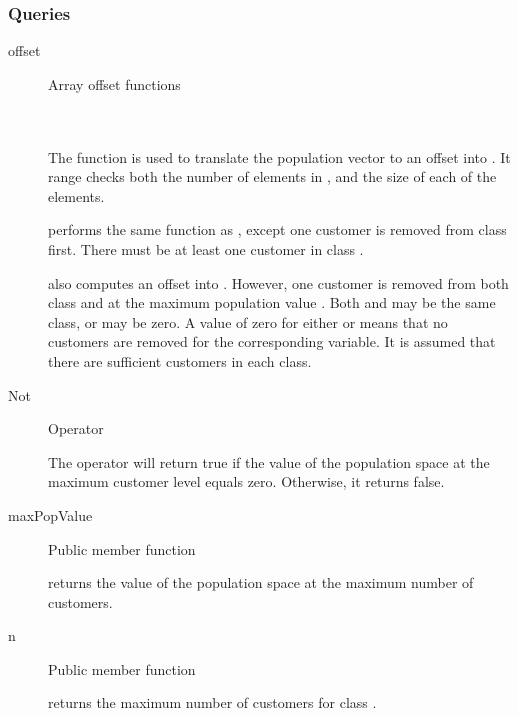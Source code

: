 \subsubsection{Queries}

\begin{description}

\item[offset] \texonly{---} Array offset functions\\
  \label{sec:population-offset}
  \\
  \\

  The  function is used to translate the population vector
   to an offset into .  It range checks both the
  number of elements in , and the size of each of the elements.

   performs the same function as ,
  except one customer is removed from class  first.  There must
  be at least one customer in class .

   also computes an offset into .
  However, one customer is removed from both class  and 
  at the maximum population value
  .  Both  and 
  may be the same class, or may be zero.  A value of zero for either
   or  means that no customers are removed for the
  corresponding variable.  It is assumed that there are sufficient
  customers in each class.

\item[Not] \texonly{---} Operator\\

  The \code{!} operator will return true if the value of the population
  space at the maximum customer level equals zero.  Otherwise, it
  returns false.

\item[maxPopValue] \texonly{---} Public member function\\

   returns the value of the population space at the
  maximum number of customers.


\item[n] \texonly{---} Public member function\\

   returns the maximum number of customers for class .

\end{description}

